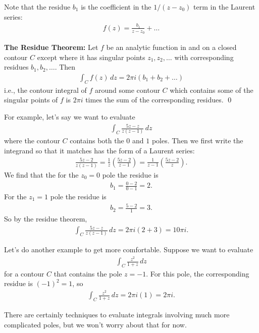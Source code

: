 \documentclass{book}
\theoremstyle{definition}
\newcommand{\f}[2]{\frac{#1}{#2}}
\newcommand{\lp}{\left(}
\newcommand{\rp}{\right)}
\begin{document}
Note that the residue $b_1$ is the coefficient in the $1 / (z - z_0)$ term in the Laurent series:
\begin{align}
f(z) = \f{b_1}{z - z_0} + \dots
\end{align}


\textbf{The Residue Theorem:} Let $f$ be an analytic function in and on a closed contour $C$ except where it has singular points $z_1, z_2, \dots$ with corresponding residues $b_1, b_2, \dots$. Then 
\begin{align}
\boxed{\int_C f(z)\,dz = 2\pi i (b_1 + b_2 + \dots)}
\end{align}
i.e., the contour integral of $f$ around some contour $C$ which contains some of the singular points of $f$ is $2\pi i$ times the sum of the corresponding residues. \qed


For example, let's say we want to evaluate
\begin{align}
\int_C \f{5z - z}{z(z- 1)}\,dz
\end{align}
where the contour $C$ contains both the $0$ and $1$ poles. Then we first write the integrand so that it matches has the form of a Laurent series:
\begin{align}
\f{5z - 2}{z(z- 1)} = \f{1}{z}\lp \f{5z - 2}{z - 1} \rp = \f{1}{z-1}\lp\f{5z - 2}{z}\rp.
\end{align}
We find that the for the $z_0 = 0$ pole the residue is 
\begin{align}
b_1 = \f{0-2}{0-1} = 2.
\end{align}
For the $z_1 = 1$ pole the residue is
\begin{align}
b_2 = \f{5 - 2}{1} = 3.
\end{align}
So by the residue theorem,
\begin{align}
\int_C \f{5z - z}{z(z- 1)}\,dz = 2\pi i(2+3) = 10\pi i.
\end{align}


Let's do another example to get more comfortable. Suppose we want to evaluate
\begin{align}
\int_C \f{z^2}{1+z}\,dz
\end{align}
for a contour $C$ that contains the pole $z = -1$. For this pole, the corresponding residue is $(-1)^2 = 1$, so 
\begin{align}
\int_C \f{z^2}{1+z}\,dz = 2\pi i(1) = 2\pi i.
\end{align}

There are certainly techniques to evaluate integrals involving much more complicated poles, but we won't worry about that for now. 
\end{document}
